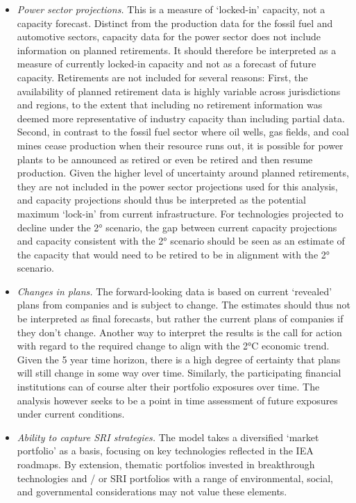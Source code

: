 \documentclass[10pt,table,a4]{article}\usepackage[]{graphicx}\usepackage[]{color}
\begin{document}
\begin{multicols}{2}
\begin{itemize}
			\item{\textit{Power sector projections.} This is a measure of `locked-in' capacity, not a capacity forecast. Distinct from the production data for the fossil fuel and automotive sectors, capacity data for the power sector does not include information on planned retirements. It should therefore be interpreted as a measure of currently locked-in capacity and not as a forecast of future capacity. Retirements are not included for several reasons: First, the availability of planned retirement data is highly variable across jurisdictions and regions, to the extent that including no retirement information was deemed more representative of industry capacity than including partial data. Second, in contrast to the fossil fuel sector where oil wells, gas fields, and coal mines cease production when their resource runs out, it is possible for power plants to be announced as retired or even be retired and then resume production. Given the higher level of uncertainty around planned retirements, they are not included in the power sector projections used for this analysis, and capacity projections should thus be interpreted as the potential maximum `lock-in' from current infrastructure. For technologies projected to decline under the 2° scenario, the gap between current capacity projections and capacity consistent with the 2° scenario should be seen as an estimate of the capacity that would need to be retired to be in alignment with the 2° scenario.} 
			
			\item{\textit{Changes in plans. }The forward-looking data is based on current `revealed' plans from companies and is subject to change. The estimates should thus not be interpreted as final forecasts, but rather the current plans of companies if they don't change. Another way to interpret the results is the call for action with regard to the required change to align with the 2°C economic trend. Given the 5 year time horizon, there is a high degree of certainty that plans will still change in some way over time. Similarly, the participating financial institutions can of course alter their portfolio exposures over time. The analysis however seeks to be a point in time assessment of future exposures under current conditions.}
			\item{\textit{Ability to capture SRI strategies. }The model takes a diversified `market portfolio' as a basis, focusing on key technologies reflected in the IEA roadmaps. By extension, thematic portfolios invested in breakthrough technologies and / or SRI portfolios with a range of environmental, social, and governmental considerations may not value these elements.}
		\end{itemize}
		
		
	\end{multicols}
	\newpage		
\end{document}
